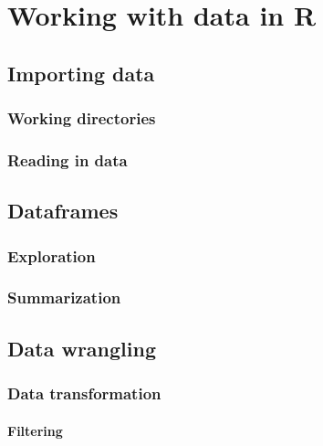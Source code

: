 \documentclass[
]{book}
\begin{document}
\hypertarget{part-working-with-data-in-r}{%
\part{Working with data in R}\label{part-working-with-data-in-r}}

\hypertarget{importing-data}{%
\chapter{Importing data}\label{importing-data}}

\hypertarget{working-directories}{%
\section{Working directories}\label{working-directories}}

\hypertarget{reading-in-data}{%
\section{Reading in data}\label{reading-in-data}}

\hypertarget{dataframes}{%
\chapter{Dataframes}\label{dataframes}}

\hypertarget{exploration}{%
\section{Exploration}\label{exploration}}

\hypertarget{summarization}{%
\section{Summarization}\label{summarization}}

\hypertarget{data-wrangling}{%
\chapter{Data wrangling}\label{data-wrangling}}

\hypertarget{data-transformation}{%
\section{Data transformation}\label{data-transformation}}

\hypertarget{filtering}{%
\subsection{Filtering}\label{filtering}}
\end{document}
